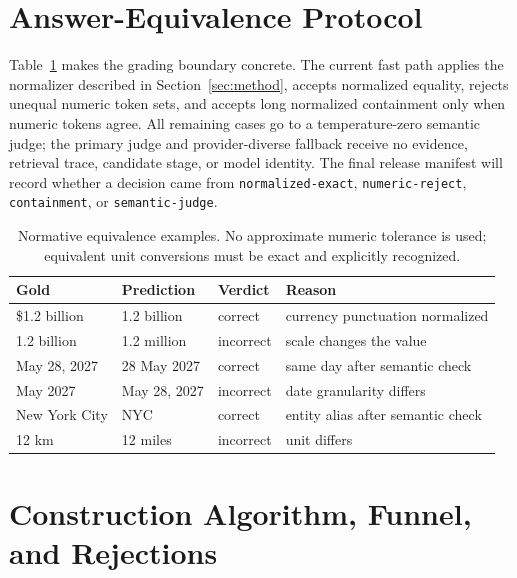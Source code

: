 \documentclass{article}
\begin{document}
\section{Answer-Equivalence Protocol}
\label{app:eq}
Table~\ref{tab:eq-examples} makes the grading boundary concrete.
The current fast path applies the normalizer described in
Section~\ref{sec:method}, accepts normalized equality, rejects unequal numeric
token sets, and accepts long normalized containment only when numeric tokens
agree.
All remaining cases go to a temperature-zero semantic judge; the primary
judge and provider-diverse fallback receive no evidence, retrieval trace,
candidate stage, or model identity.
The final release manifest will record whether a decision came from
\texttt{normalized-exact}, \texttt{numeric-reject},
\texttt{containment}, or \texttt{semantic-judge}.

\begin{table}[h]
\centering
\small
\setlength{\tabcolsep}{4pt}
\begin{tabular}{p{.23\linewidth}p{.23\linewidth}p{.13\linewidth}p{.31\linewidth}}
\toprule
Gold & Prediction & Verdict & Reason\\
\midrule
\$1.2 billion & 1.2 billion & correct & currency punctuation normalized\\
1.2 billion & 1.2 million & incorrect & scale changes the value\\
May 28, 2027 & 28 May 2027 & correct & same day after semantic check\\
May 2027 & May 28, 2027 & incorrect & date granularity differs\\
New York City & NYC & correct & entity alias after semantic check\\
12 km & 12 miles & incorrect & unit differs\\
\bottomrule
\end{tabular}
\caption{Normative equivalence examples. No approximate numeric tolerance is
used; equivalent unit conversions must be exact and explicitly recognized.}
\label{tab:eq-examples}
\end{table}

\section{Construction Algorithm, Funnel, and Rejections}
\label{app:construction}
\end{document}
